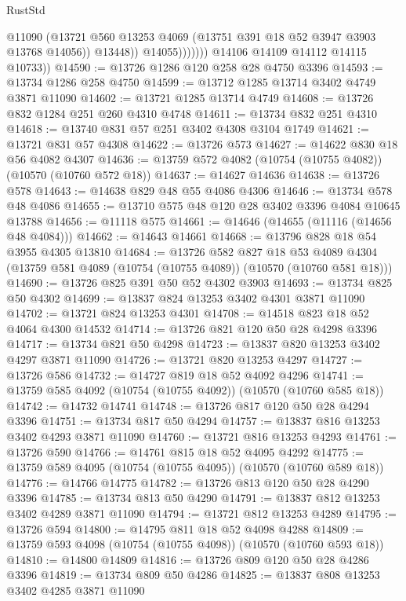 \begin{lexlean}{RustStd}
\begin{coremodule}
                          @11090
                          (@13721 @560 @13253 @4069 (@13751 @391 @18 @52 @3947 @3903 @13768 @14056))
                          @13448))
                      @14055)))))))
        @14106
        @14109
        @14112
        @14115
        @10733))
@14590 := @13726 @1286 @120 @258 @28 @4750 @3396
@14593 := @13734 @1286 @258 @4750
@14599 := @13712 @1285 @13714 @3402 @4749 @3871 @11090
@14602 := @13721 @1285 @13714 @4749
@14608 := @13726 @832 @1284 @251 @260 @4310 @4748
@14611 := @13734 @832 @251 @4310
@14618 := @13740 @831 @57 @251 @3402 @4308 @3104 @1749
@14621 := @13721 @831 @57 @4308
@14622 := @13726 @573
@14627 := @14622 @830 @18 @56 @4082 @4307
@14636 := @13759 @572 @4082 (@10754 (@10755 @4082)) (@10570 (@10760 @572 @18))
@14637 := @14627 @14636
@14638 := @13726 @578
@14643 := @14638 @829 @48 @55 @4086 @4306
@14646 := @13734 @578 @48 @4086
@14655 := @13710 @575 @48 @120 @28 @3402 @3396 @4084 @10645 @13788
@14656 := @11118 @575
@14661 := @14646 (@14655 (@11116 (@14656 @48 @4084)))
@14662 := @14643 @14661
@14668 := @13796 @828 @18 @54 @3955 @4305 @13810
@14684 := @13726
    @582
    @827
    @18
    @53
    @4089
    @4304
    (@13759 @581 @4089 (@10754 (@10755 @4089)) (@10570 (@10760 @581 @18)))
@14690 := @13726 @825 @391 @50 @52 @4302 @3903
@14693 := @13734 @825 @50 @4302
@14699 := @13837 @824 @13253 @3402 @4301 @3871 @11090
@14702 := @13721 @824 @13253 @4301
@14708 := @14518 @823 @18 @52 @4064 @4300 @14532
@14714 := @13726 @821 @120 @50 @28 @4298 @3396
@14717 := @13734 @821 @50 @4298
@14723 := @13837 @820 @13253 @3402 @4297 @3871 @11090
@14726 := @13721 @820 @13253 @4297
@14727 := @13726 @586
@14732 := @14727 @819 @18 @52 @4092 @4296
@14741 := @13759 @585 @4092 (@10754 (@10755 @4092)) (@10570 (@10760 @585 @18))
@14742 := @14732 @14741
@14748 := @13726 @817 @120 @50 @28 @4294 @3396
@14751 := @13734 @817 @50 @4294
@14757 := @13837 @816 @13253 @3402 @4293 @3871 @11090
@14760 := @13721 @816 @13253 @4293
@14761 := @13726 @590
@14766 := @14761 @815 @18 @52 @4095 @4292
@14775 := @13759 @589 @4095 (@10754 (@10755 @4095)) (@10570 (@10760 @589 @18))
@14776 := @14766 @14775
@14782 := @13726 @813 @120 @50 @28 @4290 @3396
@14785 := @13734 @813 @50 @4290
@14791 := @13837 @812 @13253 @3402 @4289 @3871 @11090
@14794 := @13721 @812 @13253 @4289
@14795 := @13726 @594
@14800 := @14795 @811 @18 @52 @4098 @4288
@14809 := @13759 @593 @4098 (@10754 (@10755 @4098)) (@10570 (@10760 @593 @18))
@14810 := @14800 @14809
@14816 := @13726 @809 @120 @50 @28 @4286 @3396
@14819 := @13734 @809 @50 @4286
@14825 := @13837 @808 @13253 @3402 @4285 @3871 @11090

\end{coremodule}
\end{lexlean}
